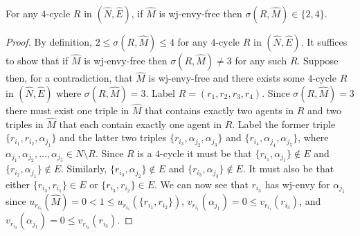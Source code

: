\begin{lem}
\label{lem:threed_efr_as_wjenvy_maxdeg2_c4splits2or4}
For any $4$-cycle $R$ in $(\hat{N}, \hat{E})$, if $\hat{M}$ is wj-envy-free then $\sigma(R, \hat{M}) \in \{ 2, 4 \}$.
\end{lem}
\begin{proof}
By definition, $2 \leq \sigma(R, \hat{M}) \leq 4$ for any $4$-cycle $R$ in $(\hat{N}, \hat{E})$. It suffices to show that if $\hat{M}$ is wj-envy-free then $\sigma(R, \hat{M}) \neq 3$ for any such $R$. Suppose then, for a contradiction, that $\hat{M}$ is wj-envy-free and there exists some $4$-cycle $R$ in $(\hat{N}, \hat{E})$ where $\sigma(R, \hat{M}) = 3$. Label $R = ( r_1, r_2, r_3, r_4 )$. Since $\sigma(R, \hat{M}) = 3$ there must exist one triple in $\hat{M}$ that contains exactly two agents in $R$ and two triples in $\hat{M}$ that each contain exactly one agent in $R$. Label the former triple $\{ r_{i_1}, r_{i_2}, \alpha_{j_1} \}$ and the latter two triples $\{ r_{i_3}, \alpha_{j_2}, \alpha_{j_3} \}$ and $\{ r_{i_4}, \alpha_{j_4}, \alpha_{j_5} \}$, where $\alpha_{j_1}, \alpha_{j_2}, \dots, \alpha_{j_5} \in N \setminus R$. Since $R$ is a $4$-cycle it must be that $\{ r_{i_1}, \alpha_{j_1} \} \notin E$ and $\{ r_{i_2}, \alpha_{j_1} \} \notin E$. Similarly, $\{ r_{i_3}, \alpha_{j_2} \} \notin E$ and $\{ r_{i_3}, \alpha_{j_3} \} \notin E$. It must also be that either $\{ r_{i_3}, r_{i_1} \} \in E$ or $\{ r_{i_3}, r_{i_2} \} \in E$. We can now see that $r_{i_3}$ has wj-envy for $\alpha_{j_1}$ since $u_{r_{i_3}}(\hat{M}) = 0 < 1 \leq u_{r_{i_3}}(\{ r_{i_1}, r_{i_2} \})$, $v_{r_{i_1}}(\alpha_{j_1}) = 0 \leq v_{r_{i_1}}(r_{i_3})$, and $v_{r_{i_2}}(\alpha_{j_1}) = 0 \leq v_{r_{i_2}}(r_{i_3})$.
\end{proof}

